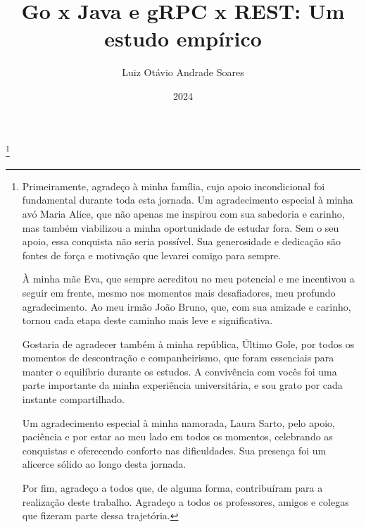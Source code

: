 \documentclass{uflamon}          %
\author{Luiz Otávio Andrade Soares}
\title{Go x Java e gRPC x REST: Um estudo empírico}
\date{2024}
\begin{document}
\maketitle


\thanks{
Primeiramente, agradeço à minha família, cujo apoio incondicional foi fundamental durante toda esta jornada.
Um agradecimento especial à minha avó Maria Alice, que não apenas me inspirou com sua sabedoria e carinho, mas também viabilizou a minha oportunidade de estudar fora.
Sem o seu apoio, essa conquista não seria possível.
Sua generosidade e dedicação são fontes de força e motivação que levarei comigo para sempre.

À minha mãe Eva, que sempre acreditou no meu potencial e me incentivou a seguir em frente, mesmo nos momentos mais desafiadores, meu profundo agradecimento.
Ao meu irmão João Bruno, que, com sua amizade e carinho, tornou cada etapa deste caminho mais leve e significativa.

Gostaria de agradecer também à minha república, Último Gole, por todos os momentos de descontração e companheirismo, que foram essenciais para manter o equilíbrio durante os estudos.
A convivência com vocês foi uma parte importante da minha experiência universitária, e sou grato por cada instante compartilhado.

Um agradecimento especial à minha namorada, Laura Sarto, pelo apoio, paciência e por estar ao meu lado em todos os momentos, celebrando as conquistas e oferecendo conforto nas dificuldades.
Sua presença foi um alicerce sólido ao longo desta jornada.

Por fim, agradeço a todos que, de alguma forma, contribuíram para a realização deste trabalho.
Agradeço a todos os professores, amigos e colegas que fizeram parte dessa trajetória.
}         %


\end{document}
